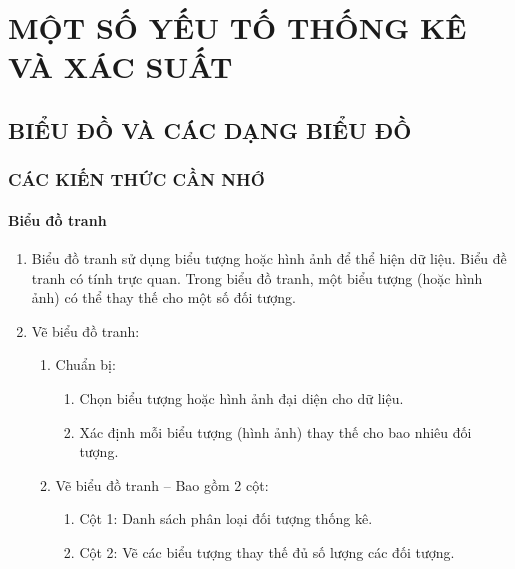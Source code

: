 \def\i{\item}
\graphicspath{{../pictures/c5/}}
\chapter{MỘT SỐ YẾU TỐ THỐNG KÊ VÀ XÁC SUẤT}
\section{BIỂU ĐỒ VÀ CÁC DẠNG BIỂU ĐỒ}
\subsection{CÁC KIẾN THỨC CẦN NHỚ}
\subsubsection{Biểu đồ tranh}
\begin{enumerate}[--,leftmargin=*]
	\i Biểu đồ tranh sử dụng biểu tượng hoặc hình ảnh để thể hiện dữ liệu. Biểu đề tranh có tính trực quan. Trong biểu đồ tranh, một biểu tượng (hoặc hình ảnh) có thể thay thế cho một số đối tượng.
	\i Vẽ biểu đồ tranh:
	\begin{enumerate}[Bước 1.,leftmargin=*]
		\i Chuẩn bị:
		\begin{enumerate}[+,leftmargin=*]
			\i Chọn biểu tượng hoặc hình ảnh đại diện cho dữ liệu.
			\i Xác định mỗi biểu tượng (hình ảnh) thay thế cho bao nhiêu đối tượng.
		\end{enumerate} 
		\i Vẽ biểu đồ tranh
		-- Bao gồm 2 cột:
		\begin{enumerate}[+,leftmargin=*]
			\i Cột 1: Danh sách phân loại đối tượng thống kê.
			\i Cột 2: Vẽ các biểu tượng thay thế đủ số lượng các đối tượng.
		\end{enumerate}
	\end{enumerate}
\end{enumerate}
